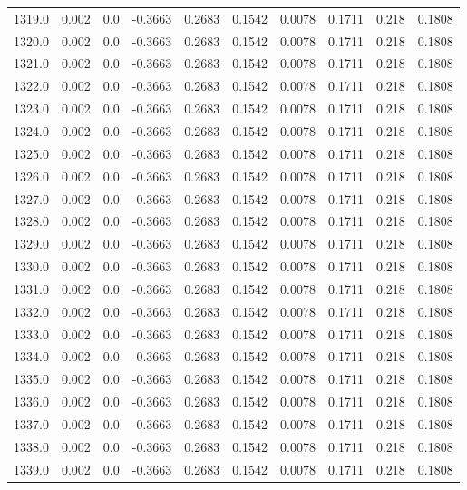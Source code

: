 \begin{longtable}{lrrrrrrrrr}
1319.0 & 0.002 & 0.0 & -0.3663 & 0.2683 & 0.1542 & 0.0078 & 0.1711 & 0.218 & 0.1808 \\
1320.0 & 0.002 & 0.0 & -0.3663 & 0.2683 & 0.1542 & 0.0078 & 0.1711 & 0.218 & 0.1808 \\
1321.0 & 0.002 & 0.0 & -0.3663 & 0.2683 & 0.1542 & 0.0078 & 0.1711 & 0.218 & 0.1808 \\
1322.0 & 0.002 & 0.0 & -0.3663 & 0.2683 & 0.1542 & 0.0078 & 0.1711 & 0.218 & 0.1808 \\
1323.0 & 0.002 & 0.0 & -0.3663 & 0.2683 & 0.1542 & 0.0078 & 0.1711 & 0.218 & 0.1808 \\
1324.0 & 0.002 & 0.0 & -0.3663 & 0.2683 & 0.1542 & 0.0078 & 0.1711 & 0.218 & 0.1808 \\
1325.0 & 0.002 & 0.0 & -0.3663 & 0.2683 & 0.1542 & 0.0078 & 0.1711 & 0.218 & 0.1808 \\
1326.0 & 0.002 & 0.0 & -0.3663 & 0.2683 & 0.1542 & 0.0078 & 0.1711 & 0.218 & 0.1808 \\
1327.0 & 0.002 & 0.0 & -0.3663 & 0.2683 & 0.1542 & 0.0078 & 0.1711 & 0.218 & 0.1808 \\
1328.0 & 0.002 & 0.0 & -0.3663 & 0.2683 & 0.1542 & 0.0078 & 0.1711 & 0.218 & 0.1808 \\
1329.0 & 0.002 & 0.0 & -0.3663 & 0.2683 & 0.1542 & 0.0078 & 0.1711 & 0.218 & 0.1808 \\
1330.0 & 0.002 & 0.0 & -0.3663 & 0.2683 & 0.1542 & 0.0078 & 0.1711 & 0.218 & 0.1808 \\
1331.0 & 0.002 & 0.0 & -0.3663 & 0.2683 & 0.1542 & 0.0078 & 0.1711 & 0.218 & 0.1808 \\
1332.0 & 0.002 & 0.0 & -0.3663 & 0.2683 & 0.1542 & 0.0078 & 0.1711 & 0.218 & 0.1808 \\
1333.0 & 0.002 & 0.0 & -0.3663 & 0.2683 & 0.1542 & 0.0078 & 0.1711 & 0.218 & 0.1808 \\
1334.0 & 0.002 & 0.0 & -0.3663 & 0.2683 & 0.1542 & 0.0078 & 0.1711 & 0.218 & 0.1808 \\
1335.0 & 0.002 & 0.0 & -0.3663 & 0.2683 & 0.1542 & 0.0078 & 0.1711 & 0.218 & 0.1808 \\
1336.0 & 0.002 & 0.0 & -0.3663 & 0.2683 & 0.1542 & 0.0078 & 0.1711 & 0.218 & 0.1808 \\
1337.0 & 0.002 & 0.0 & -0.3663 & 0.2683 & 0.1542 & 0.0078 & 0.1711 & 0.218 & 0.1808 \\
1338.0 & 0.002 & 0.0 & -0.3663 & 0.2683 & 0.1542 & 0.0078 & 0.1711 & 0.218 & 0.1808 \\
1339.0 & 0.002 & 0.0 & -0.3663 & 0.2683 & 0.1542 & 0.0078 & 0.1711 & 0.218 & 0.1808 \\

\end{longtable}
